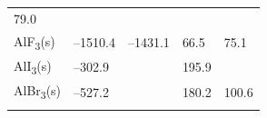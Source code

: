 \documentclass[
]{book}
\theoremstyle{definition}
\theoremstyle{definition}
\theoremstyle{definition}
\theoremstyle{remark}
\begin{document}
\begin{longtable}[]{@{}lllll@{}}
\begin{minipage}[t]{0.18\columnwidth}
79.0\strut
\end{minipage}\tabularnewline
\begin{minipage}[t]{0.10\columnwidth}\raggedright
AlF\textsubscript{3}(s)\strut
\end{minipage} & \begin{minipage}[t]{0.19\columnwidth}\raggedright
--1510.4\strut
\end{minipage} & \begin{minipage}[t]{0.20\columnwidth}\raggedright
--1431.1\strut
\end{minipage} & \begin{minipage}[t]{0.18\columnwidth}\raggedright
66.5\strut
\end{minipage} & \begin{minipage}[t]{0.18\columnwidth}\raggedright
75.1\strut
\end{minipage}\tabularnewline
\begin{minipage}[t]{0.10\columnwidth}\raggedright
AlI\textsubscript{3}(s)\strut
\end{minipage} & \begin{minipage}[t]{0.19\columnwidth}\raggedright
--302.9\strut
\end{minipage} & \begin{minipage}[t]{0.20\columnwidth}\raggedright
\strut
\end{minipage} & \begin{minipage}[t]{0.18\columnwidth}\raggedright
195.9\strut
\end{minipage} & \begin{minipage}[t]{0.18\columnwidth}\raggedright
\strut
\end{minipage}\tabularnewline
\begin{minipage}[t]{0.10\columnwidth}\raggedright
AlBr\textsubscript{3}(s)\strut
\end{minipage} & \begin{minipage}[t]{0.19\columnwidth}\raggedright
--527.2\strut
\end{minipage} & \begin{minipage}[t]{0.20\columnwidth}\raggedright
\strut
\end{minipage} & \begin{minipage}[t]{0.18\columnwidth}\raggedright
180.2\strut
\end{minipage} & \begin{minipage}[t]{0.18\columnwidth}\raggedright
100.6\strut
\end{minipage}\tabularnewline
\begin{minipage}[t]{0.10\columnwidth}\raggedright

\end{minipage}
\end{longtable}
\end{document}

